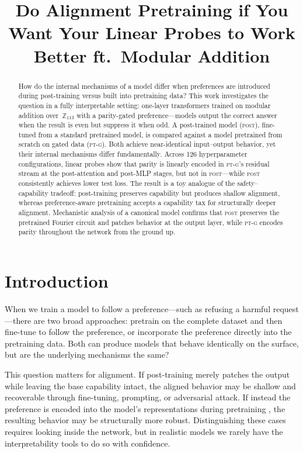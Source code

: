 \documentclass[10pt, letterpaper]{article}
\title{Do Alignment Pretraining if You Want Your Linear Probes to Work Better ft.\ Modular Addition}
\author{}
\date{}
\newcommand{\Zp}{\mathbb{Z}_{113}}
\newcommand{\POST}{\textsc{post}}
\newcommand{\PTG}{\textsc{pt-g}}
\begin{document}
\maketitle

\begin{abstract}
\noindent
How do the internal mechanisms of a model differ when preferences are introduced during post-training versus built into pretraining data?
This work investigates the question in a fully interpretable setting: one-layer transformers trained on modular addition over~$\Zp$ with a parity-gated preference---models output the correct answer when the result is even but suppress it when odd.
A post-trained model (\POST), fine-tuned from a standard pretrained model, is compared against a model pretrained from scratch on gated data (\PTG).
Both achieve near-identical input--output behavior, yet their internal mechanisms differ fundamentally.
Across 126 hyperparameter configurations, linear probes show that parity is linearly encoded in \PTG's residual stream at the post-attention and post-MLP stages, but not in \POST---while \POST{} consistently achieves lower test loss.
The result is a toy analogue of the safety--capability tradeoff: post-training preserves capability but produces shallow alignment, whereas preference-aware pretraining accepts a capability tax for structurally deeper alignment.
Mechanistic analysis of a canonical model confirms that \POST{} preserves the pretrained Fourier circuit and patches behavior at the output layer, while \PTG{} encodes parity throughout the network from the ground up.
\end{abstract}

\section{Introduction}
\label{sec:intro}

When we train a model to follow a preference---such as refusing a harmful request---there are two broad approaches: pretrain on the complete dataset and then fine-tune to follow the preference, or incorporate the preference directly into the pretraining data.
Both can produce models that behave identically on the surface, but are the underlying mechanisms the same?

This question matters for alignment.
If post-training merely patches the output \citep{jain2023mechanistically} while leaving the base capability intact, the aligned behavior may be shallow and recoverable through fine-tuning, prompting, or adversarial attack.
If instead the preference is encoded into the model's representations during pretraining \citep{aydin2025, tice2026alignmentpretrainingaidiscourse}, the resulting behavior may be structurally more robust.
Distinguishing these cases requires looking inside the network, but in realistic models we rarely have the interpretability tools to do so with confidence.
\end{document}

